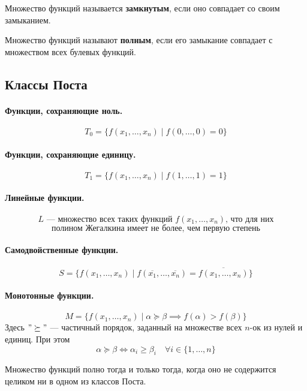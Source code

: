 \documentclass[11pt]{article}
\begin{document}
\begin{definition}
    Множество функций называется \textbf{замкнутым}, если оно совпадает со своим замыканием.
\end{definition}

\begin{definition}
    Множество функций называют \textbf{полным}, если его замыкание совпадает с множеством всех булевых функций.
\end{definition}

\subsection{Классы Поста}

\paragraph{Функции, сохраняющие ноль.}
\[T_0 = \{f(x_1, \ldots, x_n) \mid f(0, \ldots, 0) = 0\}\]
\paragraph{Функции, сохраняющие единицу.}
\[T_1 = \{f(x_1, \ldots, x_n) \mid f(1, \ldots, 1) = 1\}\]
\paragraph{Линейные функции.}
\[L \text{ --- множество всех таких функций } f(x_1, \ldots, x_n) \text{, что для них}\]
\[\text{полином Жегалкина имеет не более, чем первую степень}\]
\paragraph{Самодвойственные функции.}
\[S = \{f(x_1, \ldots, x_n) \mid f(\overline{x_1}, \ldots, \overline{x_n}) = \overline{f(x_1, \ldots, x_n)}\}\]
\paragraph{Монотонные функции.}
\[M = \{f(x_1, \ldots, x_n) \mid \alpha \succeq \beta \implies f(\alpha) > f(\beta)\}\]
Здесь $"\succeq"$ --- частичный порядок, заданный на множестве всех $n$-ок из нулей и единиц. При этом 
\[\alpha \succeq \beta \iff \alpha_i \geq \beta_i \quad \forall i \in \{1, \ldots, n\}\]

\begin{theorem}[Поста]
    Множество функций полно тогда и только тогда, когда оно не содержится целиком ни в одном
    из классов Поста.
\end{theorem}
\end{document}
